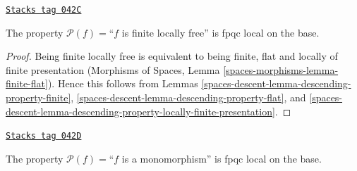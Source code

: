 \begin{lemma}
\label{spaces-descent-lemma-descending-property-finite-locally-free}
\href{https://stacks.math.columbia.edu/tag/042C}{\texttt{Stacks tag 042C}}

The property $\mathcal{P}(f) =$``$f$ is finite locally free''
is fpqc local on the base.
\end{lemma}

\begin{proof}
Being finite locally free is equivalent to being
finite, flat and locally of finite presentation
(Morphisms of Spaces, Lemma \ref{spaces-morphisms-lemma-finite-flat}).
Hence this follows from Lemmas
\ref{spaces-descent-lemma-descending-property-finite},
\ref{spaces-descent-lemma-descending-property-flat}, and
\ref{spaces-descent-lemma-descending-property-locally-finite-presentation}.
\end{proof}

\begin{lemma}
\label{spaces-descent-lemma-descending-property-monomorphism}
\href{https://stacks.math.columbia.edu/tag/042D}{\texttt{Stacks tag 042D}}

The property $\mathcal{P}(f) =$``$f$ is a monomorphism''
is fpqc local on the base.
\end{lemma}

